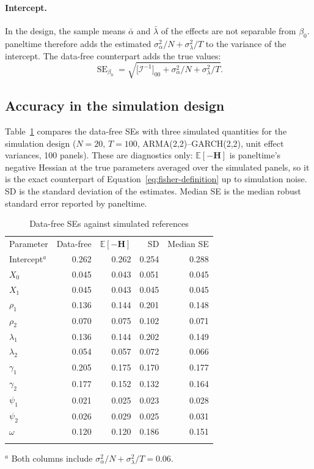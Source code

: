 \documentclass[12pt]{article}
\renewcommand{\toprule}{\specialrule{0.1mm}{0em}{0em}}  %
\renewcommand{\midrule}{\specialrule{0.1mm}{0em}{0em}}  %
\renewcommand{\bottomrule}{\specialrule{0.1mm}{0em}{0em}}  %
\begin{document}
\paragraph{Intercept.} In the design, the sample means $\bar\alpha$ and $\bar\lambda$ of the effects are not separable from $\beta_0$. paneltime therefore adds the estimated $\sigma_\alpha^2/N+\sigma_\lambda^2/T$ to the variance of the intercept. The data-free counterpart adds the true values:
\begin{equation}
\operatorname{SE}_{\beta_0}=\sqrt{\big[\mathcal I^{-1}\big]_{00}+\sigma_\alpha^2/N+\sigma_\lambda^2/T}.
\end{equation}

\subsection{Accuracy in the simulation design}\label{sec:expected-se-truth}
Table~\ref{tab:data-free-se} compares the data-free SEs with three simulated quantities for the simulation design ($N=20$, $T=100$, ARMA(2,2)--GARCH(2,2), unit effect variances, 100 panels). These are diagnostics only: $\mathbb E[-\mathbf H]$ is paneltime's negative Hessian at the true parameters averaged over the simulated panels, so it is the exact counterpart of Equation~\ref{eq:fisher-definition} up to simulation noise. SD is the standard deviation of the estimates. Median SE is the median robust standard error reported by paneltime.

\begin{table}[H]
\centering
\caption{Data-free SEs against simulated references}\label{tab:data-free-se}
\begin{tabular}{lrrrr}
\toprule
Parameter & Data-free & $\mathbb E[-\mathbf H]$ & SD & Median SE\\
\midrule
Intercept$^{a}$ & 0.262 & 0.262 & 0.254 & 0.288\\
$X_0$ & 0.045 & 0.043 & 0.051 & 0.045\\
$X_1$ & 0.045 & 0.043 & 0.045 & 0.045\\
$\rho_1$ & 0.136 & 0.144 & 0.201 & 0.148\\
$\rho_2$ & 0.070 & 0.075 & 0.102 & 0.071\\
$\lambda_1$ & 0.136 & 0.144 & 0.202 & 0.149\\
$\lambda_2$ & 0.054 & 0.057 & 0.072 & 0.066\\
$\gamma_1$ & 0.205 & 0.175 & 0.170 & 0.177\\
$\gamma_2$ & 0.177 & 0.152 & 0.132 & 0.164\\
$\psi_1$ & 0.021 & 0.025 & 0.023 & 0.028\\
$\psi_2$ & 0.026 & 0.029 & 0.025 & 0.031\\
$\omega$ & 0.120 & 0.120 & 0.186 & 0.151\\
\bottomrule
\end{tabular}

\smallskip
{\footnotesize $^{a}$ Both columns include $\sigma_\alpha^2/N+\sigma_\lambda^2/T=0.06$.}
\end{table}
\end{document}
